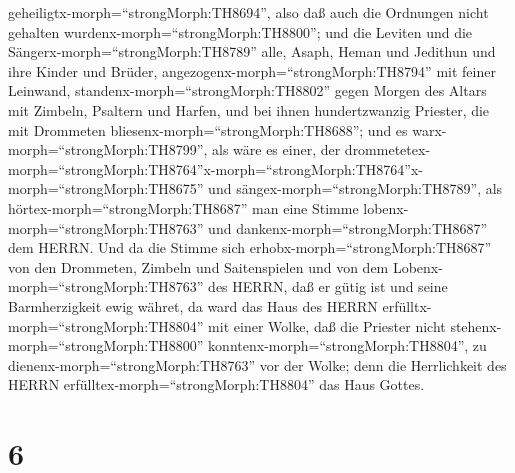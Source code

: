 geheiligtx-morph=``strongMorph:TH8694'', also daß auch die Ordnungen
nicht gehalten wurdenx-morph=``strongMorph:TH8800'';  und
die Leviten und die Sängerx-morph=``strongMorph:TH8789'' alle, Asaph,
Heman und Jedithun und ihre Kinder und Brüder,
angezogenx-morph=``strongMorph:TH8794'' mit feiner Leinwand,
standenx-morph=``strongMorph:TH8802'' gegen Morgen des Altars mit
Zimbeln, Psaltern und Harfen, und bei ihnen hundertzwanzig Priester, die
mit Drommeten bliesenx-morph=``strongMorph:TH8688'';  und
es warx-morph=``strongMorph:TH8799'', als wäre es einer, der
drommetetex-morph=``strongMorph:TH8764''x-morph=``strongMorph:TH8764''\textbar x-morph=``strongMorph:TH8675''
und sängex-morph=``strongMorph:TH8789'', als
hörtex-morph=``strongMorph:TH8687'' man eine Stimme
lobenx-morph=``strongMorph:TH8763'' und
dankenx-morph=``strongMorph:TH8687'' dem HERRN. Und da die Stimme sich
erhobx-morph=``strongMorph:TH8687'' von den Drommeten, Zimbeln und
Saitenspielen und von dem Lobenx-morph=``strongMorph:TH8763'' des HERRN,
daß er gütig ist und seine Barmherzigkeit ewig währet, da ward das Haus
des HERRN erfülltx-morph=``strongMorph:TH8804'' mit einer Wolke,
 daß die Priester nicht
stehenx-morph=``strongMorph:TH8800''
konntenx-morph=``strongMorph:TH8804'', zu
dienenx-morph=``strongMorph:TH8763'' vor der Wolke; denn die
Herrlichkeit des HERRN erfülltex-morph=``strongMorph:TH8804'' das Haus
Gottes.

\hypertarget{section-5}{%
\section{6}\label{section-5}}

